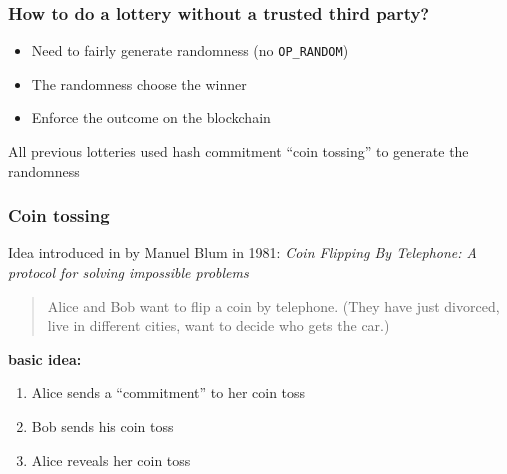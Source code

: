\documentclass{beamer}
\begin{document}

\begin{frame}
\frametitle{How to do a lottery without a trusted third party?}

\begin{itemize}
    \item Need to fairly generate randomness (no \texttt{OP\_RANDOM})
    \item The randomness choose the winner
    \item Enforce the outcome on the blockchain
\end{itemize}

All previous lotteries used hash commitment ``coin tossing'' to generate the randomness
\end{frame}


\begin{frame}
\frametitle{Coin tossing}
Idea introduced in by Manuel Blum in 1981: \textit{Coin Flipping By Telephone: A protocol for solving impossible problems}

\begin{quote}
    Alice and Bob want to flip a coin by telephone.
(They have just divorced, live in different cities,
want to decide who gets the car.) 
\end{quote}
\pause
\textbf{basic idea:}
\begin{enumerate}
    \item Alice sends a ``commitment'' to her coin toss
    \item Bob sends his coin toss
    \item Alice reveals her coin toss
\end{enumerate}

\end{frame}

\end{document}
